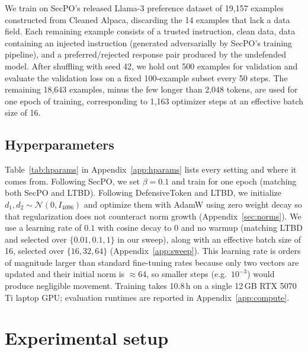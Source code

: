 \documentclass{article}
\begin{document}
We train on SecPO's released Llama-3 preference dataset of 19{,}157 examples constructed from Cleaned Alpaca, discarding the 14 examples that lack a data field. Each remaining example consists of a trusted instruction, clean data, data containing an injected instruction (generated adversarially by SecPO's training pipeline), and a preferred/rejected response pair produced by the undefended model. After shuffling with seed 42, we hold out 500 examples for validation and evaluate the validation loss on a fixed 100-example subset every 50 steps. The remaining 18{,}643 examples, minus the few longer than 2{,}048 tokens, are used for one epoch of training, corresponding to 1{,}163 optimizer steps at an effective batch size of 16.

\subsection{Hyperparameters}
\label{sec:hparams}

Table~\ref{tab:hparams} in Appendix~\ref{app:hparams} lists every setting and where it comes from. Following SecPO, we set $\beta = 0.1$ and train for one epoch (matching both SecPO and LTBD). Following DefensiveToken and LTBD, we initialize $d_1, d_2 \sim \mathcal{N}(0, I_{4096})$ and optimize them with AdamW using zero weight decay so that regularization does not counteract norm growth (Appendix~\ref{sec:norms}). We use a learning rate of $0.1$ with cosine decay to $0$ and no warmup (matching LTBD and selected over $\{0.01, 0.1, 1\}$ in our sweep), along with an effective batch size of 16, selected over $\{16, 32, 64\}$ (Appendix~\ref{app:sweep}). This learning rate is orders of magnitude larger than standard fine-tuning rates because only two vectors are updated and their initial norm is $\approx 64$, so smaller steps (e.g.\ $10^{-3}$) would produce negligible movement. Training takes 10.8\,h on a single 12\,GB RTX 5070 Ti laptop GPU; evaluation runtimes are reported in Appendix~\ref{app:compute}.

\section{Experimental setup}
\label{sec:setup}
\end{document}
